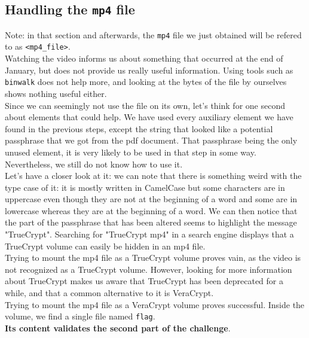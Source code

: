 \documentclass[12pt,a4paper]{article}
\begin{document}
    \subsection{Handling the \texttt{mp4} file}
    Note: in that section and afterwards, the \texttt{mp4} file we just
    obtained will be refered to as \texttt{<mp4\_file>}.\\

    Watching the video informs us about something that occurred at the end of January, but does not provide us really useful information. Using tools such as \texttt{binwalk} does not help more, and looking at the bytes of the file by ourselves shows nothing useful either.\\

    Since we can seemingly not use the file on its own, let's think for one
    second about elements that could help. We have used every auxiliary element
    we have found in the previous steps, except the string that looked like a
    potential passphrase that we got from the pdf document. That passphrase
    being the only unused element, it is very likely to be used in that step in
    some way. Nevertheless, we still do not know how to use it.\\

    Let's have a closer look at it: we can note that there is something weird
    with the type case of it: it is mostly written in CamelCase but some
    characters are in uppercase even though they are not at the beginning of a
    word and some are in lowercase whereas they are at the beginning of a word.
    We can then notice that the part of the passphrase that has been altered
    seems to highlight the message "TrueCrypt". Searching for "TrueCrypt mp4"
    in a search engine displays that a TrueCrypt volume can easily be hidden in
    an mp4 file.\\

    Trying to mount the mp4 file as a TrueCrypt volume proves vain, as the
    video is not recognized as a TrueCrypt volume. However, looking for more
    information about TrueCrypt makes us aware that TrueCrypt has been
    deprecated for a while, and that a common alternative to it is VeraCrypt.\\

    Trying to mount the mp4 file as a VeraCrypt volume proves successful.
    Inside the volume, we find a single file named \texttt{flag}.\\
    \textbf{Its content validates the second part of the challenge}.

    
\end{document}
